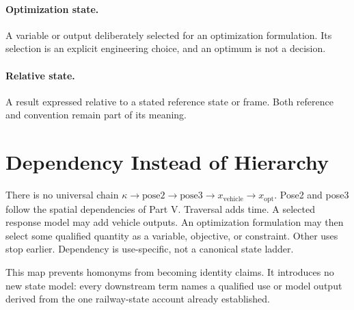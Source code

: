 \paragraph{Optimization state.}
\label{def:taxonomy-optimization-state}
A variable or output deliberately selected for an optimization formulation.
Its selection is an explicit engineering choice, and an optimum is not a
decision.

\paragraph{Relative state.}
\label{def:taxonomy-relative-state}
A result expressed relative to a stated reference state or frame. Both
reference and convention remain part of its meaning.

\section{Dependency Instead of Hierarchy}

There is no universal chain
\(\kappa\rightarrow\mathrm{pose2}\rightarrow\mathrm{pose3}\rightarrow
x_{\mathrm{vehicle}}\rightarrow x_{\mathrm{opt}}\).
Pose2 and pose3 follow the spatial dependencies of Part V. Traversal adds time.
A selected response model may add vehicle outputs. An optimization formulation
may then select some qualified quantity as a variable, objective, or
constraint. Other uses stop earlier. Dependency is use-specific, not a
canonical state ladder.

\begin{summary}
This map prevents homonyms from becoming identity claims. It introduces no
new state model: every downstream term names a qualified use or model output
derived from the one railway-state account already established.
\end{summary}
